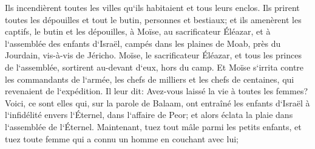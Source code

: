 \verse Ils incendièrent toutes les villes qu`ils habitaient et tous leurs enclos. 
\verse Ils prirent toutes les dépouilles et tout le butin, personnes et bestiaux; 
\verse et ils amenèrent les captifs, le butin et les dépouilles, à Moïse, au sacrificateur Éléazar, et à l`assemblée des enfants d`Israël, campés dans les plaines de Moab, près du Jourdain, vis-à-vis de Jéricho. 
\verse Moïse, le sacrificateur Éléazar, et tous les princes de l`assemblée, sortirent au-devant d`eux, hors du camp. 
\verse Et Moïse s`irrita contre les commandants de l`armée, les chefs de milliers et les chefs de centaines, qui revenaient de l`expédition. 
\verse Il leur dit: Avez-vous laissé la vie à toutes les femmes? 
\verse Voici, ce sont elles qui, sur la parole de Balaam, ont entraîné les enfants d`Israël à l`infidélité envers l`Éternel, dans l`affaire de Peor; et alors éclata la plaie dans l`assemblée de l`Éternel. 
\verse Maintenant, tuez tout mâle parmi les petits enfants, et tuez toute femme qui a connu un homme en couchant avec lui; 
